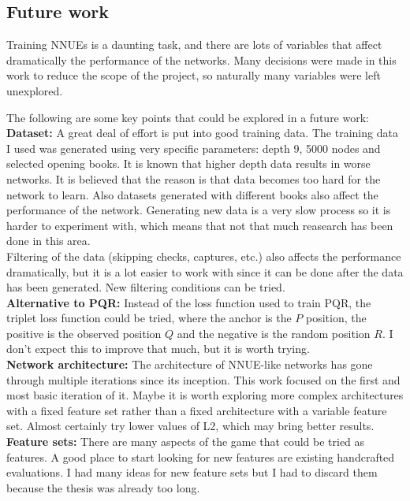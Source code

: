 \newpage
\subsection{Future work}

Training NNUEs is a daunting task, and there are lots of variables that affect dramatically the performance of the networks. Many decisions were made in this work to reduce the scope of the project, so naturally many variables were left unexplored.

The following are some key points that could be explored in a future work: \\

\textbf{Dataset:} A great deal of effort is put into good training data. The training data I used was generated using very specific parameters: depth 9, 5000 nodes and selected opening books. It is known that higher depth data results in worse networks. It is believed that the reason is that data becomes too hard for the network to learn. Also datasets generated with different books also affect the performance of the network.  Generating new data is a very slow process so it is harder to experiment with, which means that not that much reasearch has been done in this area. \\
Filtering of the data (skipping checks, captures, etc.) also affects the performance dramatically, but it is a lot easier to work with since it can be done after the data has been generated. New filtering conditions can be tried. \\

\textbf{Alternative to PQR:} Instead of the loss function used to train PQR, the triplet loss function could be tried, where the anchor is the $P$ position, the positive is the observed position $Q$ and the negative is the random position $R$. I don't expect this to improve that much, but it is worth trying. \\

\textbf{Network architecture:} The architecture of NNUE-like networks has gone through multiple iterations since its inception. This work focused on the first and most basic iteration of it. Maybe it is worth exploring more complex architectures with a fixed feature set rather than a fixed architecture with a variable feature set.
Almost certainly try lower values of L2, which may bring better results. \\

\textbf{Feature sets:} There are many aspects of the game that could be tried as features. A good place to start looking for new features are existing handcrafted evaluations. I had many ideas for new feature sets but I had to discard them because the thesis was already too long.

